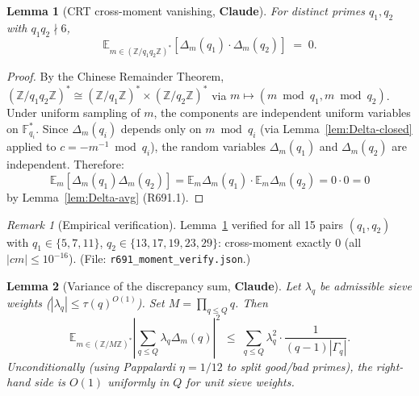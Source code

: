 \documentclass[12pt]{amsart}
\newtheorem{lemma}{Lemma}
\theoremstyle{definition}
\theoremstyle{remark}
\newtheorem{remark}{Remark}
\begin{document}
\begin{lemma}[CRT cross-moment vanishing, \textbf{Claude}]\label{lem:Claude-CRT}
For distinct primes $q_1, q_2$ with $q_1 q_2 \nmid 6$,
$$
\mathbb{E}_{m \in (\mathbb{Z}/q_1 q_2 \mathbb{Z})^*}
\left[ \Delta_m(q_1) \cdot \Delta_m(q_2) \right]
\;=\;
0.
$$
\end{lemma}

\begin{proof}
By the Chinese Remainder Theorem, $(\mathbb{Z}/q_1 q_2 \mathbb{Z})^* \cong (\mathbb{Z}/q_1 \mathbb{Z})^* \times (\mathbb{Z}/q_2 \mathbb{Z})^*$ via $m \mapsto (m \bmod q_1, m \bmod q_2)$. Under uniform sampling of $m$, the components are independent uniform variables on $\mathbb{F}_{q_i}^*$. Since $\Delta_m(q_i)$ depends only on $m \bmod q_i$ (via Lemma~\ref{lem:Delta-closed} applied to $c = -m^{-1} \bmod q_i$), the random variables $\Delta_m(q_1)$ and $\Delta_m(q_2)$ are independent. Therefore:
$$
\mathbb{E}_m [\Delta_m(q_1) \Delta_m(q_2)]
= \mathbb{E}_m \Delta_m(q_1) \cdot \mathbb{E}_m \Delta_m(q_2)
= 0 \cdot 0 = 0
$$
by Lemma~\ref{lem:Delta-avg} (R691.1).
\end{proof}

\begin{remark}[Empirical verification]
Lemma~\ref{lem:Claude-CRT} verified for all 15 pairs $(q_1, q_2)$ with $q_1 \in \{5, 7, 11\}$, $q_2 \in \{13, 17, 19, 23, 29\}$: cross-moment exactly $0$ (all $|cm| \le 10^{-16}$). \hfill(File: \texttt{r691\_moment\_verify.json}.)
\end{remark}

\begin{lemma}[Variance of the discrepancy sum, \textbf{Claude}]\label{lem:Claude-var-sum}
Let $\lambda_q$ be admissible sieve weights ($|\lambda_q| \le \tau(q)^{O(1)}$). Set $M = \prod_{q \le Q} q$. Then
$$
\mathbb{E}_{m \in (\mathbb{Z}/M\mathbb{Z})^*}
\left| \sum_{q \le Q} \lambda_q \Delta_m(q) \right|^2
\;\le\;
\sum_{q \le Q} \lambda_q^2 \cdot \frac{1}{(q-1) |\Gamma_q|}.
$$
Unconditionally (using Pappalardi $\eta = 1/12$ to split good/bad primes), the right-hand side is $O(1)$ uniformly in $Q$ for unit sieve weights.
\end{lemma}
\end{document}
